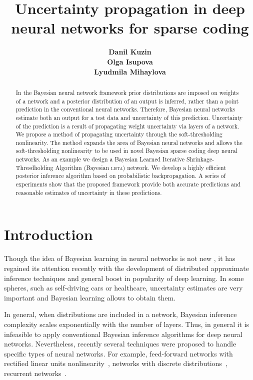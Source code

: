 \documentclass[letterpaper]{article}
\title{Uncertainty propagation in deep neural networks for sparse coding}
\author{} %
\author{ {\bf Danil Kuzin} \\
\And
{\bf Olga Isupova}  \\
\And
{\bf Lyudmila Mihaylova}   \\
}
\begin{document}
\maketitle

\begin{abstract}
In the Bayesian neural network framework prior distributions are imposed on weights of a network and a posterior distribution of an output is inferred, rather than a point prediction in the conventional neural networks. Therefore, Bayesian neural networks estimate both an output for a test data and uncertainty of this prediction. Uncertainty of the prediction is a result of propagating weight uncertainty via layers of a network. We propose a method of propagating uncertainty through the soft-thresholding nonlinearity. The method expands the area of Bayesian neural networks and allows the soft-thresholding nonlinearity to be used in novel Bayesian sparse coding deep neural networks. As an example we design a Bayesian Learned Iterative Shrinkage-Thresdholding Algorithm (Bayesian \textsc{lista}) network. We develop a highly efficient posterior inference algorithm based on probabilistic backpropagation. A series of experiments show that the proposed framework provide both accurate predictions and reasonable estimates of uncertainty in these predictions.
\end{abstract}

\section{Introduction}
Though the idea of Bayesian learning in neural networks is not new \citep{neal2012bayesian}, it has regained its attention recently with the development of distributed approximate inference techniques \citep{li2015stochastic, hoffman2013stochastic}  and general boost in popularity of deep learning. In some spheres, such as self-driving cars or healthcare, uncertainty estimates are very important and Bayesian learning allows to obtain them. 

In general, when distributions are included in a network, Bayesian inference complexity scales exponentially with the number of layers. Thus, in general it is infeasible to apply conventional Bayesian inference algorithms for deep neural networks. Nevertheless, recently several techniques were proposed to handle specific types of neural networks. For example, feed-forward networks with rectified linear units nonlinearity~\citep{hernandez2015probabilistic}, networks with discrete distributions~\citep{soudry2014expectation}, recurrent networks~\citep{mcdermott2017bayesian}. 
\end{document}
